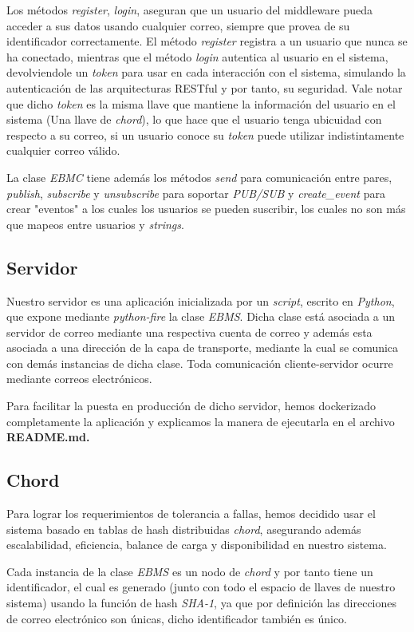 \documentclass[a4paper]{article}
\begin{document}
	Los métodos \emph{register}, \emph{login}, aseguran que un usuario del middleware pueda acceder a sus datos usando cualquier correo, siempre que provea de su identificador correctamente. El método \emph{register} registra a un usuario que nunca se ha conectado, mientras que el método \emph{login} autentica al usuario en el sistema, devolviendole un \emph{token} para usar en cada interacción con el sistema, simulando la autenticación de las arquitecturas RESTful y por tanto, su seguridad. Vale notar que dicho \emph{token} es la misma llave que mantiene la información del usuario en el sistema (Una llave de \emph{chord}), lo que hace que el usuario tenga ubicuidad con respecto a su correo, si un usuario conoce su \emph{token} puede utilizar indistintamente cualquier correo válido.
	
	La clase \emph{EBMC} tiene además los métodos \emph{send} para comunicación entre pares, \emph{publish},  \emph{subscribe} y \emph{unsubscribe} para soportar \emph{PUB/SUB} y \emph{create_event} para crear "eventos" a los cuales los usuarios se pueden suscribir, los cuales no son más que mapeos entre usuarios y \emph{strings}.
	
	\subsection{Servidor}
	Nuestro servidor es una aplicación inicializada por un \emph{script}, escrito en \emph{Python}, que expone mediante \emph{python-fire} la clase \emph{EBMS}. Dicha clase está asociada a un servidor de correo mediante una respectiva cuenta de correo y además esta asociada a una dirección de la capa de transporte, mediante la cual se comunica con demás instancias de dicha clase. Toda comunicación cliente-servidor ocurre mediante correos electrónicos.
	
	Para facilitar la puesta en producción de dicho servidor, hemos dockerizado completamente la aplicación y explicamos la manera de ejecutarla en el archivo \bfseries{README.md}.
	
	
	\subsection{Chord}
	Para lograr los requerimientos de tolerancia a fallas, hemos decidido usar el sistema basado en tablas de hash distribuidas \emph{chord}, asegurando además escalabilidad, eficiencia, balance de carga y disponibilidad en nuestro sistema.
	
	Cada instancia de la clase \emph{EBMS} es un nodo de \emph{chord} y por tanto tiene un identificador, el cual es generado (junto con todo el espacio de llaves de nuestro sistema) usando la función de hash \emph{SHA-1}, ya que por definición las direcciones de correo electrónico son únicas, dicho identificador también es único.
	
\end{document}
